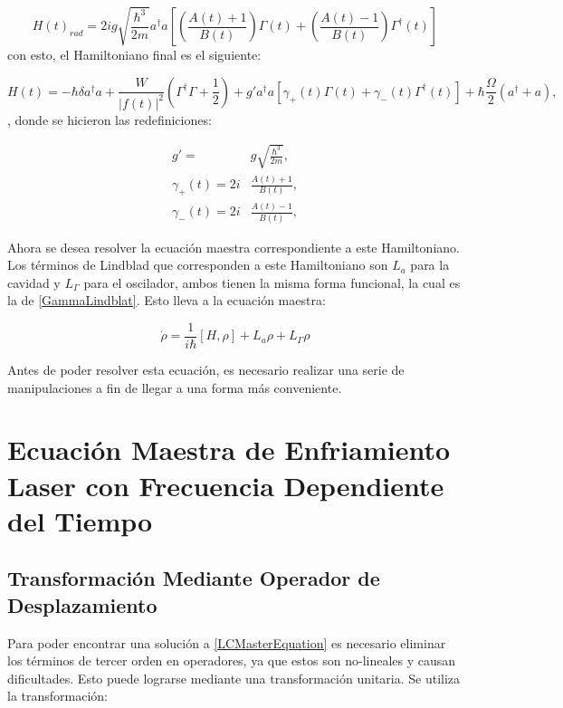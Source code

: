 \documentclass[a4paper,10pt]{report}
\begin{document}
\begin{equation}
H(t)_{rad} = 2ig\sqrt{\frac{\hbar^3}{2m}}  a^\dagger a[(\frac{A(t) +1}{B(t)})\Gamma (t) +(\frac{A(t) -1}{B(t)})\Gamma^\dagger (t)]
\end{equation} con esto, el Hamiltoniano final es el siguiente:

\begin{equation}\label{LaserCoolingHamiltonian}
H(t) = -\hbar \delta a^\dagger a + \frac{W}{|f(t)|^2}(\Gamma^\dagger \Gamma + \frac{1}{2}) +  g'a^\dagger a[\gamma_+(t)\Gamma (t) +\gamma_-(t)\Gamma^\dagger (t)] + \hbar\frac{\Omega}{2}(a^\dagger + a),
\end{equation}, donde se hicieron las redefiniciones:

\begin{align*}
g'=&g\sqrt{\frac{\hbar^3}{2m}},\\
\gamma_+(t)=2i&\frac{A(t) +1}{B(t)},\\
\gamma_-(t)=2i&\frac{A(t) -1}{B(t)},
\end{align*} 

Ahora se desea resolver la ecuación maestra correspondiente a este Hamiltoniano. Los términos de Lindblad que corresponden a este Hamiltoniano son $L_a$ para la cavidad y $L_\Gamma$ para el oscilador, ambos tienen la misma forma funcional, la cual es la de \ref{GammaLindblat}. Esto lleva a la ecuación maestra:

\begin{equation}\label{LCMasterEquation}
\dot{\rho} = \frac{1}{i\hbar}[H,\rho] + L_a\rho + L_\Gamma \rho
\end{equation}

Antes de poder resolver esta ecuación, es necesario realizar una serie de manipulaciones a fin de llegar a una forma más conveniente.

\chapter{Ecuación Maestra de Enfriamiento Laser con Frecuencia Dependiente del Tiempo}

\section{Transformación Mediante Operador de Desplazamiento}

Para poder encontrar una solución a \ref{LCMasterEquation} es necesario eliminar los términos de tercer orden en operadores, ya que estos son no-lineales y causan dificultades. Esto puede lograrse mediante una transformación unitaria. Se utiliza la transformación:
\end{document}
